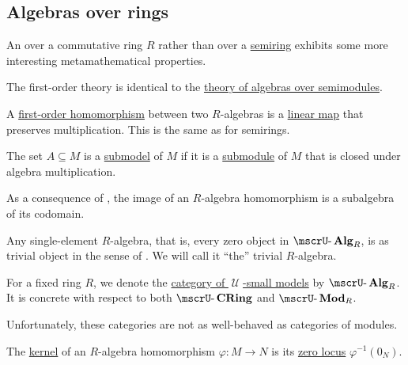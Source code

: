 \subsection{Algebras over rings}\label{subsec:algebras_over_rings}

\begin{definition}\label{def:algebra_over_ring}
  An  over a commutative ring \( R \) rather than over a \hyperref[def:algebra_over_semiring]{semiring} exhibits some more interesting metamathematical properties.

  \begin{thmenum}
     The first-order theory is identical to the \hyperref[def:algebra_over_semiring/theory]{theory of algebras over semimodules}.

     A \hyperref[def:first_order_homomorphism]{first-order homomorphism} between two \( R \)-algebras is a \hyperref[def:semimodule/homomorphism]{linear map} that preserves multiplication. This is the same as for semirings.

     The set \( A \subseteq M \) is a \hyperref[def:first_order_submodel]{submodel} of \( M \) if it is a \hyperref[def:monoid/submodel]{submodule} of \( M \) that is closed under algebra multiplication.

    As a consequence of , the image of an \( R \)-algebra homomorphism is a subalgebra of its codomain.

     Any single-element \( R \)-algebra, that is, every zero object in \( \ucat{Alg}_R \), is as trivial object in the sense of . We will call it \enquote{the} trivial \( R \)-algebra.

     For a fixed ring \( R \), we denote the \hyperref[def:category_of_small_first_order_models]{category of \( \mscrU \)-small models} by \( \ucat{Alg}_R \). It is concrete with respect to both \( \ucat{CRing} \) and \( \ucat{Mod}_R \).

    Unfortunately, these categories are not as well-behaved as categories of modules.

     The \hyperref[def:zero_morphisms/kernel]{kernel} of an \( R \)-algebra homomorphism \( \varphi: M \to N \) is its \hyperref[def:zero_locus]{zero locus} \( \varphi^{-1}(0_N) \).


\end{thmenum}
\end{definition}
